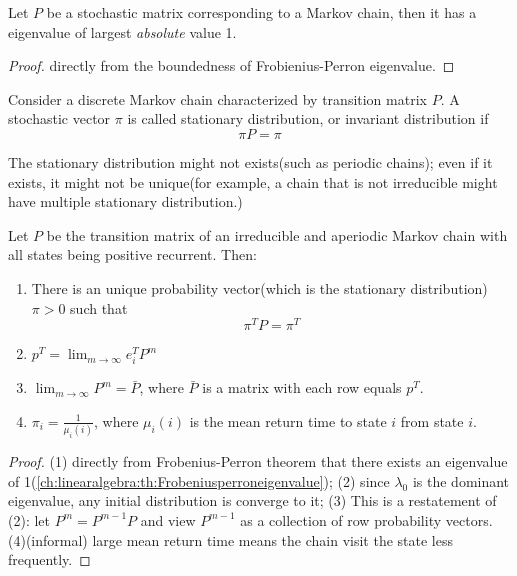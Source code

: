 \begin{refsection}
\begin{theorem}
Let $P$ be a stochastic matrix corresponding to a Markov chain, then it has a eigenvalue of largest \emph{absolute} value 1.
\end{theorem}
\begin{proof}
directly from the boundedness of Frobienius-Perron eigenvalue.
\end{proof}


\begin{definition}
	Consider a discrete Markov chain characterized by transition matrix $P$. A stochastic vector $\pi$ is called stationary distribution, or invariant distribution if $$\pi P = \pi$$
\end{definition}
\begin{remark}
The stationary distribution might not exists(such as periodic chains); even if it exists, it might not be unique(for example, a chain that is not irreducible might have multiple stationary distribution.)
\end{remark}

\begin{theorem}
\cite[230]{luenberger1979introduction}\label{ch:markov-chains:th:basiclimittheoremmarkovchain}\cite[133]{privault2013understanding}Let $P$ be the transition matrix of an irreducible and aperiodic Markov chain with all states being positive recurrent. Then:
\begin{enumerate}
\item There is an unique probability vector(which is the stationary distribution) $\pi > 0$ such that
$$\pi^T P = \pi^T$$
\item $p^T = \lim_{m \to \infty} e_i^T P^m$
\item $\lim_{m \to \infty} P^m = \bar{P}$, where $\bar{P}$ is a matrix with each row equals $p^T$.
\item $\pi_i = \frac{1}{\mu_i(i)}$, where $\mu_i(i)$ is the mean return time to state $i$ from state $i$.
\end{enumerate}
\end{theorem}
\begin{proof}
(1) directly from Frobenius-Perron theorem that there exists an eigenvalue of 1(\autoref{ch:linearalgebra:th:Frobeniusperroneigenvalue}); (2) since $\lambda_0$ is the dominant eigenvalue, any initial distribution is converge to it; (3) This is a restatement of (2): let $P^m = P^{m-1} P$ and view $P^{m-1}$ as a collection of row probability vectors. (4)(informal) large mean return time means the chain visit the state less frequently. 
\end{proof}


\end{refsection}
